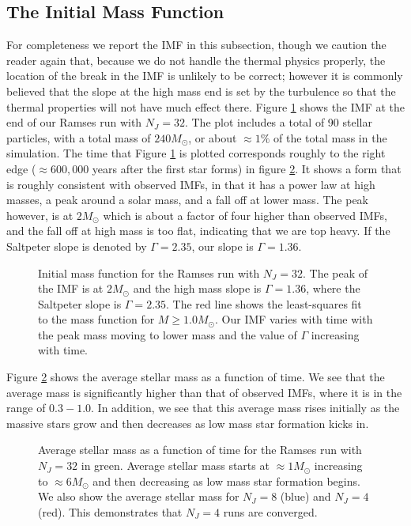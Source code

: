 \documentclass[../dissertation.tex]{subfiles}
\begin{document}
\subsection{The Initial Mass Function}

For completeness we report the IMF in this subsection, though we caution the reader again that, because we do not handle the thermal physics properly, the location of the break in the IMF is unlikely to be correct; however it is commonly believed that the slope at the high mass end is set by the turbulence so that the thermal properties will not have much effect there.
Figure \ref{fig:hydro_imf} shows the IMF at the end of our Ramses run with $N_J = 32$. 
The plot includes a total of 90 stellar particles, with a total mass of $240 M_\odot$, or about  $\approx 1 \%$ of the total mass in the simulation. The time that Figure \ref{fig:hydro_imf} is plotted corresponds roughly to the right edge ($\approx 600,000$ years after the first star forms) in figure \ref{fig:hydro_avg_mass}. 
It shows a form that is roughly consistent with observed IMFs, in that it has a power law at high masses, a peak around a solar mass, and a fall off at lower mass. The peak however, is at $2 M_\odot$ which is about a factor of four higher than observed IMFs, and the fall off at high mass is too flat, indicating that we are top heavy. If the Saltpeter slope is denoted by $\Gamma = 2.35$, our slope is $\Gamma = 1.36$. 

\begin{figure}[htb]
\caption[Hydro Initial Mass Function]{Initial mass function for the Ramses run with $N_J = 32$. The peak of the IMF is at $2 M_\odot$ and the high mass slope is $\Gamma = 1.36$, where the Saltpeter slope is $\Gamma = 2.35$. The red line shows the least-squares fit to the mass function for $M \geq 1.0 M_\odot$. Our IMF varies with time with the peak mass moving to lower mass and the value of $\Gamma$ increasing with time. \label{fig:hydro_imf}}
\end{figure}

Figure \ref{fig:hydro_avg_mass} shows the average stellar mass as a function of time. We see that the average mass is significantly higher than that of observed IMFs, where it is in the range of $0.3 - 1.0$. In addition, we see that this average mass rises initially as the massive stars grow and then decreases as low mass star formation kicks in.

\begin{figure}[htb]
\caption[Hydro Average Stellar Mass as a function of time since the first star formed]{Average stellar mass as a function of time for the Ramses run with $N_J = 32$ in green. Average stellar mass starts at $\approx 1 M_\odot$ increasing to $\approx 6 M_\odot$ and then decreasing as low mass star formation begins. We also show the average stellar mass for $N_J = 8$ (blue) and $N_J = 4$ (red). This demonstrates that $N_J = 4$ runs are converged. \label{fig:hydro_avg_mass}}
\end{figure}
\end{document}
